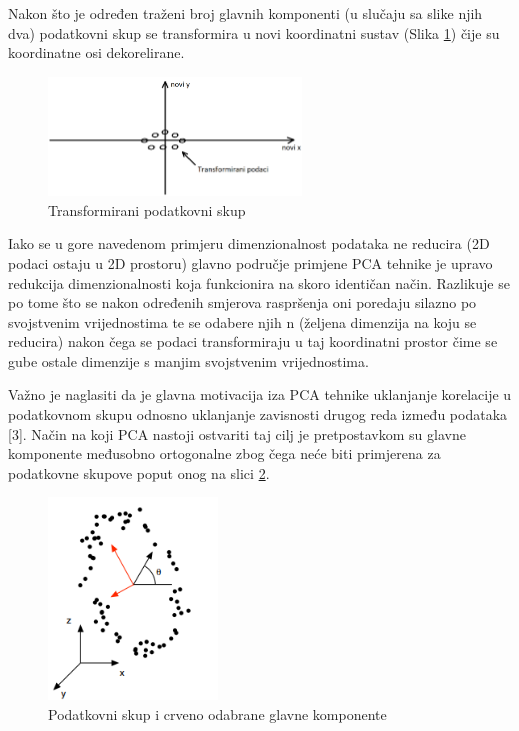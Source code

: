 \documentclass[times, utf8, proizvoljni, numeric]{fer}
\begin{document}
Nakon što je određen traženi broj glavnih komponenti (u slučaju sa slike njih dva) podatkovni skup se transformira u novi koordinatni sustav (Slika \ref{fg:pca_end}) čije su koordinatne osi dekorelirane.

\begin{figure}[H]
	\begin{center}
		\captionsetup{justification=centering}
		\includegraphics[width=0.6\textwidth]{./imgs/pca_end.png}
		\caption{Transformirani podatkovni skup}
		\label{fg:pca_end}
	\end{center}
\end{figure}

Iako se u gore navedenom primjeru dimenzionalnost podataka ne reducira (2D podaci ostaju u 2D prostoru) glavno područje primjene PCA tehnike je upravo redukcija dimenzionalnosti koja funkcionira na skoro identičan način. Razlikuje se po tome što se nakon određenih smjerova raspršenja oni poredaju silazno po svojstvenim vrijednostima te se odabere njih n (željena dimenzija na koju se reducira) nakon čega se podaci transformiraju u taj koordinatni prostor čime se gube ostale dimenzije s manjim svojstvenim vrijednostima. 

Važno je naglasiti da je glavna motivacija iza PCA tehnike uklanjanje korelacije u podatkovnom skupu odnosno uklanjanje zavisnosti drugog reda između podataka [3]. Način na koji PCA nastoji ostvariti taj cilj je pretpostavkom su glavne komponente međusobno ortogonalne zbog čega neće biti primjerena za podatkovne skupove poput onog na slici \ref{fg:pca_problem}.

\begin{figure}[H]
	\begin{center}
		\captionsetup{justification=centering}
		\includegraphics[width=0.4\textwidth]{./imgs/pca_problem.png}
		\caption{Podatkovni skup i crveno odabrane glavne komponente \cite{PCA}}
		\label{fg:pca_problem}
	\end{center}
\end{figure}
\end{document}
